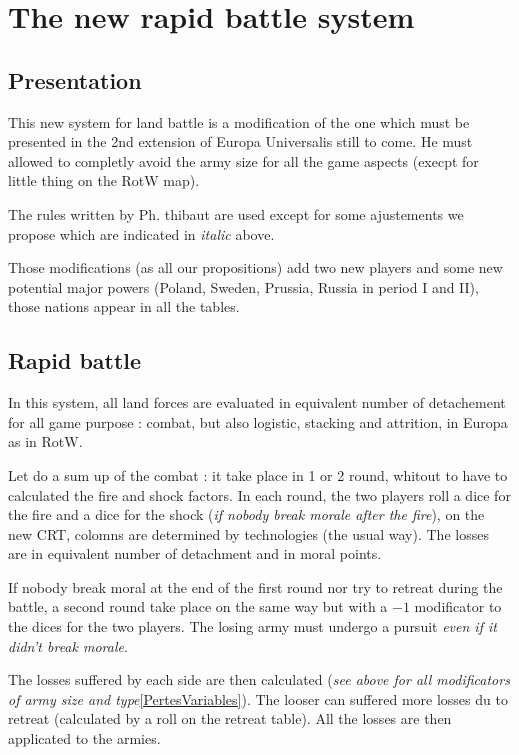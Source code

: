 \chapter{The new rapid battle system}

\section{Presentation}

This new system for land battle is a modification of the one which must be
presented in the 2nd extension of Europa Universalis still to come. He
must allowed to completly avoid the army size for all the game aspects
(execpt for little thing on the RotW map).

The rules written by Ph. thibaut are used except for some ajustements we
propose which are indicated in {\it italic} above.

Those modifications (as all our propositions) add two new players and some
new potential major powers (Poland, Sweden, Prussia, Russia in period I
and II), those nations appear in all the tables.

\section{Rapid battle}

In this system, all land forces are evaluated in equivalent number of
detachement for all game purpose : combat, but also logistic, stacking and
attrition, in Europa as in RotW.

Let do a sum up of the combat : it take place in 1 or 2 round, whitout to
have to calculated the fire and shock factors. In each round, the two
players roll a dice for the fire and a dice for the shock ({\it if nobody 
break morale after the fire}), on the new CRT, colomns are determined by
technologies (the usual way). The losses are in equivalent number of  
detachment and in moral points.

If nobody break moral at the end of the first round nor try to retreat 
during the battle, a second round take place on the same way but with a
$-1$ modificator to the dices for the two players. The losing army must
undergo a pursuit {\it even if it didn't break morale}.

The losses suffered by each side are then calculated ({\it see above for
all modificators of army size and type}\ref{PertesVariables}). The looser can suffered
more losses du to retreat (calculated by a roll on the retreat table).
All the losses are then applicated to the armies.

